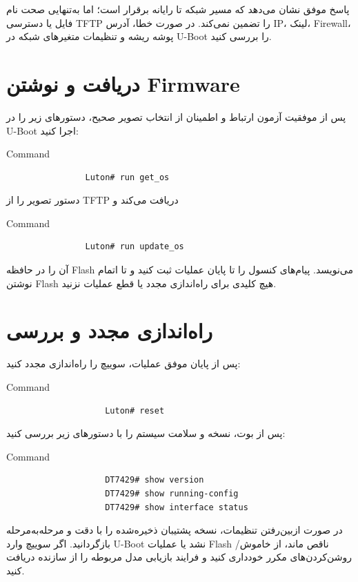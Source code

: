 \documentclass[11pt,letterpaper]{report}
\begin{document}
	پاسخ موفق  نشان می‌دهد که مسیر شبکه تا رایانه برقرار است؛
	اما به‌تنهایی صحت نام فایل یا دسترسی TFTP را تضمین نمی‌کند. در صورت
	خطا، آدرس IP، لینک، Firewall، پوشه ریشه و تنظیمات متغیرهای شبکه
	در U-Boot را بررسی کنید.

	\section{دریافت و نوشتن Firmware}

	پس از موفقیت آزمون ارتباط و اطمینان از انتخاب تصویر صحیح، دستورهای
	زیر را در U-Boot اجرا کنید:

	\begin{LTR}
		\begin{cliexample}{Command}
			\begin{verbatim}
				Luton# run get_os
			\end{verbatim}
		\end{cliexample}
	\end{LTR}
		دستور  تصویر را از TFTP دریافت می‌کند و
	\begin{LTR}
		\begin{cliexample}{Command}
			\begin{verbatim}
				Luton# run update_os
			\end{verbatim}
		\end{cliexample}
	\end{LTR}


	 آن را در حافظه Flash می‌نویسد. پیام‌های کنسول
	را تا پایان عملیات ثبت کنید و تا اتمام نوشتن Flash هیچ کلیدی برای
	راه‌اندازی مجدد یا قطع عملیات نزنید.

	\section{راه‌اندازی مجدد و بررسی}

	پس از پایان موفق عملیات، سوییچ را راه‌اندازی مجدد کنید:

	\begin{LTR}
		\begin{cliexample}{Command}
			\begin{verbatim}
					Luton# reset
			\end{verbatim}
		\end{cliexample}
	\end{LTR}

	پس از بوت، نسخه و سلامت سیستم را با دستورهای زیر بررسی کنید:

	\begin{LTR}
		\begin{cliexample}{Command}
			\begin{verbatim}
					DT7429# show version
					DT7429# show running-config
					DT7429# show interface status
			\end{verbatim}
		\end{cliexample}
	\end{LTR}

	در صورت ازبین‌رفتن تنظیمات، نسخه پشتیبان ذخیره‌شده را با دقت و
	مرحله‌به‌مرحله بازگردانید. اگر سوییچ وارد U-Boot نشد یا عملیات
	Flash ناقص ماند، از خاموش/روشن‌کردن‌های مکرر خودداری کنید و فرایند
	بازیابی مدل مربوطه را از سازنده دریافت کنید.
\end{document}
